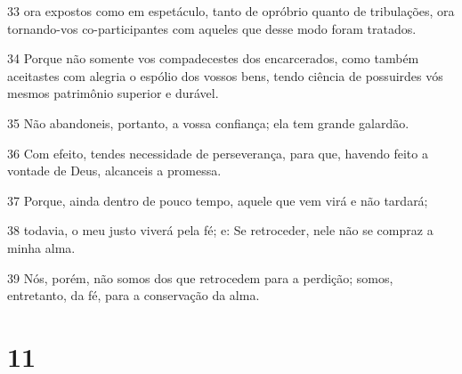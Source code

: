 \par 33 ora expostos como em espetáculo, tanto de opróbrio quanto de tribulações, ora tornando-vos co-participantes com aqueles que desse modo foram tratados.
\par 34 Porque não somente vos compadecestes dos encarcerados, como também aceitastes com alegria o espólio dos vossos bens, tendo ciência de possuirdes vós mesmos patrimônio superior e durável.
\par 35 Não abandoneis, portanto, a vossa confiança; ela tem grande galardão.
\par 36 Com efeito, tendes necessidade de perseverança, para que, havendo feito a vontade de Deus, alcanceis a promessa.
\par 37 Porque, ainda dentro de pouco tempo, aquele que vem virá e não tardará;
\par 38 todavia, o meu justo viverá pela fé; e: Se retroceder, nele não se compraz a minha alma.
\par 39 Nós, porém, não somos dos que retrocedem para a perdição; somos, entretanto, da fé, para a conservação da alma.

\chapter{11}

